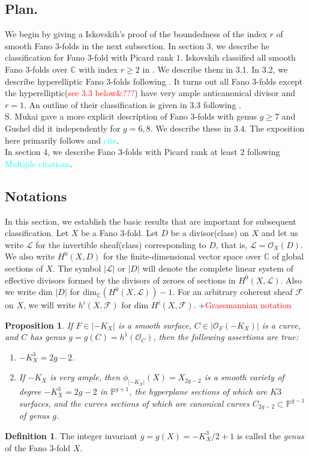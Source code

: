 \documentclass[11pt]{amsart}
\theoremstyle{plain}
\newtheorem{proposition}[theorem]{Proposition}
\theoremstyle{definition}
\newtheorem{definition}[theorem]{Definition}
\theoremstyle{expl}
\begin{document}
\subsection{Plan.} We begin by giving a Iskovskih's proof of the boundedness of the index $r$ of smooth Fano $3$-folds in the next subsection. In section 3, we describe he classification for Fano $3$-fold with Picard rank $1$. Iskovskih classified all smooth Fano $3$-folds over $\mathbb{C}$ with index $r\geq 2$ in \cite{Isk77}.  We describe them in 3.1. In 3.2, we describe hyperelliptic Fano $3$-folds following \cite{Isk77}. It turns out all Fano $3$-folds except the hyperelliptic(\textcolor{red}{see 3.3 below\&???}) have very ample anticanonical divisor and $r=1$. An outline of their classification is given in 3.3 following \cite{Isk78}.\\
S. Mukai gave a more explicit description of Fano $3$-folds with genus $g\geq 7$ and Gushel did it independently for $g=6,8$. We describe these in 3.4. The exposition here primarily follows \cite{Muk89} and \textcolor{cyan}{cite}.\\
In section 4, we describe Fano $3$-folds with Picard rank at least $2$ following \textcolor{cyan}{Multiple citations}. 

\subsection{Notations}
In this section, we establish the basic results that are important for subsequent classification. 
Let $X$ be a Fano $3$-fold. 
Let $D$ be a divisor(class) on $X$ and let us write $\mathcal{L}$ for the invertible sheaf(class) corresponding to $D$, that is, $\mathcal{L} = \mathcal{O}_X(D)$. We also write $H^0(X,D)$ for the finite-dimensional vector space over $\mathbb{C}$ of global sections of $X$.
The symbol $|\mathcal{L}|$ or $|D|$ will denote the complete linear system of effective divisors formed by the divisors of zeroes of sections in $H^0(X,\mathcal{L})$. Also we write dim $|D|$ for dim$_{\mathbb{C}}(H^0(X,\mathcal{L})) -1$.
For an arbitrary coherent sheaf $\mathcal{F}$ on $X$, we will write $h^i(X,\mathcal{F})$ for dim $H^i(X,\mathcal{F})$. +\textcolor{red}{Grassmannian notation}
\begin{proposition}
\label{A}
    If $F \in |-K_X|$ is a smooth surface, $C \in |\mathcal{O}_F(-K_X)|$ is a curve, and $C$ has genus $g=g(C) = h^1(\mathcal{O}_C)$, then the following assertions are true:
    \begin{enumerate}
        \item[(i)] $-K_{X}^3 = 2g-2 $.
        \item[(ii)] If $-K_X$ is very ample, then $\phi_{|-K_X|}(X)= X_{2g-2}$ is a smooth variety of degree $-K_{X}^3 = 2g-2$ in $\mathbb{P}^{g+1}$, the hyperplane sections of which are $K3$ surfaces, and the curves sections of which are canonical curves $C_{2g-2} \subset \mathbb{P}^{g-1}$ of genus $g$.
    \end{enumerate}
\end{proposition}
\begin{definition}
    The integer invariant $g=g(X) = -K_{X}^3 /2 +1$ is called the \textit{genus} of the Fano $3$-fold $X$.
\end{definition}
\end{document}
